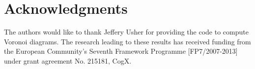 \documentclass[letterpaper]{article}
\begin{document}
\section{Acknowledgments}

The authors would like to thank Jeffery Usher for providing the code to compute Voronoi diagrams. The research leading to these results has received funding from the European Community's Seventh Framework Programme [FP7/2007-2013] under grant agreement No. 215181, CogX.

  
\end{document}
